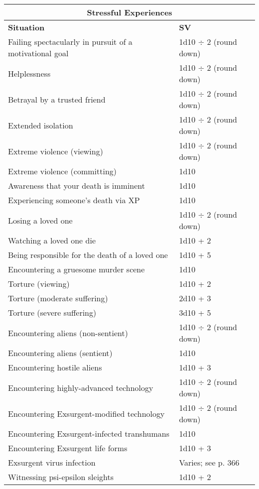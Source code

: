 \begin{table}
\begin{tabularx}{\textwidth}{|X|l|}
\hline
\multicolumn{2}{|c|}{\textbf{Stressful Experiences} } \\
\hline
\textbf{Situation}									& \textbf{SV} 				\\
\hline
Failing spectacularly in pursuit of a motivational goal	& 1d10 $\div$ 2 (round down)	\\
\hline
Helplessness										& 1d10 $\div$ 2 (round down)	\\
\hline
Betrayal by a trusted friend							& 1d10 $\div$ 2 (round down)	\\
\hline
Extended isolation									& 1d10 $\div$ 2 (round down)	\\
\hline
Extreme violence (viewing)							& 1d10 $\div$ 2 (round down)	\\
\hline
Extreme violence (committing)							& 1d10					\\
\hline
Awareness that your death is imminent					& 1d10					\\
\hline
Experiencing someone’s death via XP					& 1d10					\\
\hline
Losing a loved one									& 1d10 $\div$ 2 (round down)	\\
\hline
Watching a loved one die								& 1d10 + 2				\\
\hline
Being responsible for the death of a loved one			& 1d10 + 5				\\
\hline
Encountering a gruesome murder scene					& 1d10					\\
\hline
Torture (viewing)									& 1d10 + 2				\\
\hline
Torture (moderate suffering)							& 2d10 + 3				\\
\hline
Torture (severe suffering)							& 3d10 + 5				\\
\hline
Encountering aliens (non-sentient)						& 1d10 $\div$ 2 (round down)	\\
\hline
Encountering aliens (sentient)						& 1d10					\\
\hline
Encountering hostile aliens							& 1d10 + 3				\\
\hline
Encountering highly-advanced technology					& 1d10 $\div$ 2 (round down)	\\
\hline
Encountering Exsurgent-modified technology				& 1d10 $\div$ 2 (round down)	\\
\hline
Encountering Exsurgent-infected transhumans				& 1d10					\\
\hline
Encountering Exsurgent life forms						& 1d10 + 3				\\
\hline
Exsurgent virus infection							& Varies; see p. 366		\\
\hline
Witnessing psi-epsilon sleights						& 1d10 + 2				\\
\hline
\end{tabularx}
\label{tab:stressful-experiences}
\end{table}


